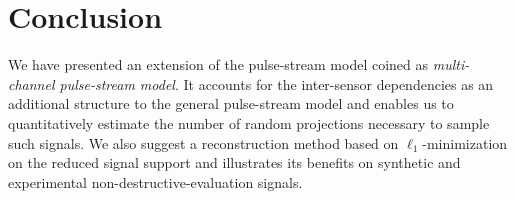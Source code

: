 \documentclass{article}
\theoremstyle{definition}
\begin{document}
\section{Conclusion}
\label{sec_concl}
We have presented an extension of the pulse-stream model coined as \textit{multi-channel pulse-stream model}. It accounts for the inter-sensor dependencies as an additional structure to the general pulse-stream model and enables us to quantitatively estimate the number of random projections necessary to sample such signals. We also suggest a reconstruction method based on $\ell_1$-minimization on the reduced signal support and illustrates its benefits on synthetic and experimental non-destructive-evaluation signals.






%





\end{document}
